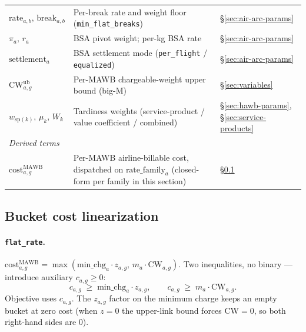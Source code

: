 \documentclass[11pt,a4paper]{article}
\theoremstyle{definition}
\begin{document}
\begin{table}[H]
\begin{tabular}{lp{9cm}p{3.5cm}}
$\text{rate}_{a,b},\, \text{break}_{a,b}$ & Per-break rate and weight floor (\texttt{min\_flat\_breaks}) & \S\ref{sec:air-arc-params} \\
$\pi_a,\, r_a$ & BSA pivot weight; per-kg BSA rate & \S\ref{sec:air-arc-params} \\
$\text{settlement}_a$ & BSA settlement mode (\texttt{per\_flight} / \texttt{equalized}) & \S\ref{sec:air-arc-params} \\
$\text{CW}^{\text{ub}}_{a,g}$ & Per-MAWB chargeable-weight upper bound (big-M) & \S\ref{sec:variables} \\
$w_{\text{sp}(k)},\, \mu_k,\, W_k$ & Tardiness weights (service-product / value coefficient / combined) & \S\ref{sec:hawb-params}, \S\ref{sec:service-products} \\
\midrule
\multicolumn{3}{l}{\textit{Derived terms}} \\
$\text{cost}^{\text{MAWB}}_{a,g}$ & Per-MAWB airline-billable cost, dispatched on $\text{rate\_family}_a$ (closed-form per family in this section) & \S\ref{sec:lin-bucket} \\
\bottomrule
\end{tabular}
\end{table}

\subsection{Bucket cost linearization}
\label{sec:lin-bucket}

\paragraph{\texttt{flat\_rate}.}
$\text{cost}^{\text{MAWB}}_{a,g} = \max(\text{min\_chg}_a \cdot z_{a,g},\,
m_a \cdot \text{CW}_{a,g})$. Two inequalities, no binary --- introduce
auxiliary $c_{a,g} \geq 0$:
\[
  c_{a,g} \;\geq\; \text{min\_chg}_a \cdot z_{a,g}, \qquad
  c_{a,g} \;\geq\; m_a \cdot \text{CW}_{a,g}.
\]
Objective uses $c_{a,g}$. The $z_{a,g}$ factor on the minimum charge keeps an
empty bucket at zero cost (when $z = 0$ the upper-link bound forces
$\text{CW} = 0$, so both right-hand sides are $0$).
\end{document}
